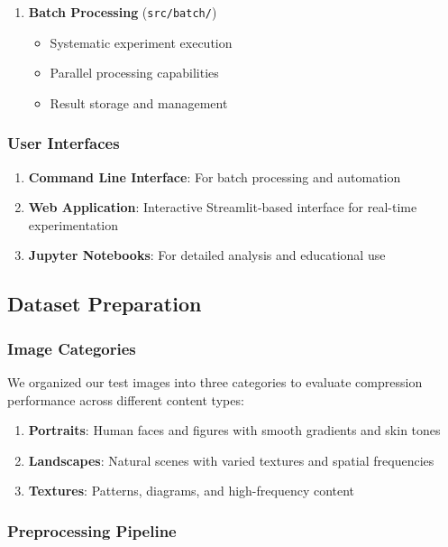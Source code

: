 \documentclass[12pt,a4paper]{article}
\begin{document}
\begin{enumerate}
    \item \textbf{Batch Processing} (\texttt{src/batch/})
    \begin{itemize}
        \item Systematic experiment execution
        \item Parallel processing capabilities
        \item Result storage and management
    \end{itemize}
\end{enumerate}

\subsubsection{User Interfaces}

\begin{enumerate}
    \item \textbf{Command Line Interface}: For batch processing and automation
    \item \textbf{Web Application}: Interactive Streamlit-based interface for real-time experimentation
    \item \textbf{Jupyter Notebooks}: For detailed analysis and educational use
\end{enumerate}

\subsection{Dataset Preparation}

\subsubsection{Image Categories}

We organized our test images into three categories to evaluate compression performance across different content types:

\begin{enumerate}
    \item \textbf{Portraits}: Human faces and figures with smooth gradients and skin tones
    \item \textbf{Landscapes}: Natural scenes with varied textures and spatial frequencies
    \item \textbf{Textures}: Patterns, diagrams, and high-frequency content
\end{enumerate}

\subsubsection{Preprocessing Pipeline}
\end{document}
